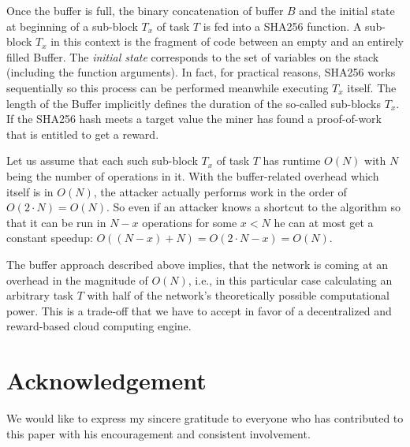 \documentclass{sig-alternate}
\begin{document}
Once the buffer is full, the binary concatenation of buffer $B$ and the initial state at beginning of a sub-block $T_x$ of task $T$ is fed into a SHA256 function. A sub-block $T_x$ in this context is the fragment of code between an empty and an entirely filled Buffer. The \emph{initial state} corresponds to the set of variables on the stack (including the function arguments). In fact, for practical reasons, SHA256 works sequentially so this process can be performed meanwhile executing $T_x$ itself. The length of the Buffer implicitly defines the duration of the so-called sub-blocks $T_x$. If the SHA256 hash meets a target value the miner has found a proof-of-work that is entitled to get a reward.

Let us assume that each such sub-block $T_x$ of task $T$ has runtime $O(N)$ with $N$ being the number of operations in it. With the buffer-related overhead which itself is in $O(N)$, the attacker actually performs work in the order of $O(2 \cdot N) = O(N)$. So even if an attacker knows a shortcut to the algorithm so that it can be run in $N-x$ operations for some $x<N$ he can at most get a constant speedup: $O((N-x)+N) = O(2 \cdot N-x) = O(N)$.

The buffer approach described above implies, that the network is coming at an overhead in the magnitude of $O(N)$, i.e., in this particular case calculating an arbitrary task $T$ with half of the network's theoretically possible computational power. This is a trade-off that we have to accept in favor of a decentralized and reward-based cloud computing engine.



\section*{Acknowledgement}

We would like to express my sincere gratitude to everyone who has contributed to this paper with his encouragement and consistent involvement.



\end{document}
